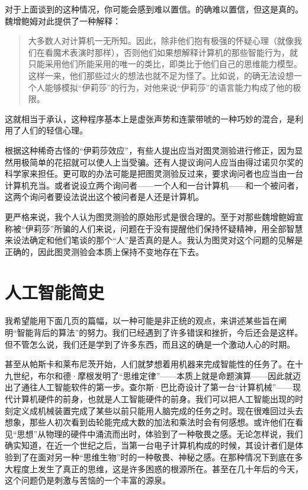 对于上面谈到的这种情况，你可能会感到难以置信。的确难以置信，但这是真的。魏增鲍姆对此提供了一种解释：

\begin{quote}
大多数人对计算机一无所知。因此，除非他们抱有极强的怀疑心理（就像我们在看魔术表演时那样），否则他们如果想解释计算机的那些智能行为，就只能采用他们所能采用的唯一的类比，即类比于他们自己的思维能力模型。这样一来，他们那些过火的想法也就不足为怪了。比如说，的确无法设想一个人能够模拟“伊莉莎”的行为，对他来说“伊莉莎”的语言能力构成了他的极限。
\end{quote}
这就相当于承认，这种程序基本上是虚张声势和连蒙带唬的一种巧妙的混合，是利用了人们的轻信心理。

根据这种稀奇古怪的“伊莉莎效应”，有些人提出应当对图灵测验进行修正，因为显然用极简单的花招就可以使人上当受骗。还有人提议询问人应当由得过诺贝尔奖的科学家来担任。更可取的办法可能是把图灵测验反过来，要求询问者也应当由一台计算机充当。或者说设立两个询问者——一个人和一台计算机——和一个被问者，这两个询问者要设法说出这个被问者是人还是计算机。

更严格来说，我个人认为图灵测验的原始形式是很合理的。至于对那些魏增鲍姆宣称被“伊莉莎”所骗的人们来说，问题在于没有提醒他们保持怀疑精神，用全部智慧来设法确定和他们笔谈的那个“人”是否真的是人。我认为图灵对这个问题的见解是正确的，因此图灵测验会本质上保持不变地存在下去。

\section{人工智能简史}

我希望能用下面几页的篇幅，以一种可能是非正统的观点，来讲述某些旨在阐明“智能背后的算法”的努力。我们已经遇到了许多错误和挫折，今后还会是这样。但不管怎么说，我们还是学到了许多东西，而且这的确是一个激动人心的时期。

甚至从帕斯卡和莱布尼茨开始，人们就梦想着用机器来完成智能性的任务了。在十九世纪，布尔和德·摩根发明了“思维定律”——本质上就是命题演算——因此就迈出了通往人工智能软件的第一步。查尔斯·巴比奇设计了第一台“计算机械”——现代计算机硬件的前身，也就是人工智能硬件的前身。我们可以把人工智能出现的时刻定义成机械装置完成了某些以前只能用人脑完成的任务之时。现在很难回过头去想象，那些人初次看到齿轮能完成大数的加法和乘法时会有何感想。或许他们在看见“思想”从物理的硬件中涌流而出时，体验到了一种敬畏之感。无论怎样说，我们确实知道，在近一个世纪之后，当第一台电子计算机构成的时候，其设计者们是体验到了在面对另一种“思维生物”时的一种敬畏、神秘之感。在那种情况下到底在多大程度上发生了真正的思维，这是许多困惑的根源所在。甚至在几十年后的今天，这个问题仍是刺激与苦恼的一个丰富的源泉。

